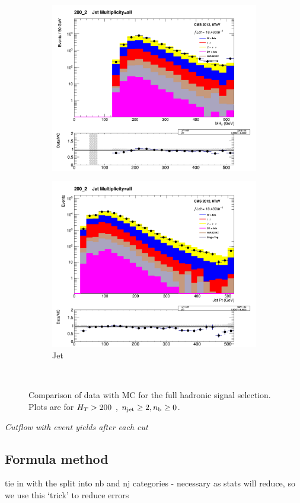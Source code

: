 \begin{figure}[!ht]
    \begin{subfigure}[b]{0.48\textwidth}
      \includegraphics[width=\textwidth]{Figs/datamc/had/Stacked_MHT_all_200_upwards}
      \caption{\mht}
    \end{subfigure}
    \begin{subfigure}[b]{0.48\textwidth}
      \includegraphics[width=\textwidth]{Figs/datamc/had/Stacked_CommonJetPt_all_200_upwards}
      \caption{Jet \Pt}
    \end{subfigure} \\
    \caption{\label{fig:datamc_had_inc}
    Comparison of data with MC for the full hadronic signal selection. Plots 
    are for $H_T>200$ \gev, $n_{\text{jet}}\geq2, n_{\text{b}}\geq0$.
    }
\end{figure}

\emph{Cutflow with event yields after each cut}

\subsection{Formula method}

tie in with the split into nb and nj categories - necessary as stats will reduce, so we use
this `trick' to reduce errors

